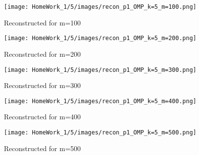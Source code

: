 \documentclass{article}
\begin{document}
\begin{figure}[h!]
    \centering
    \begin{minipage}{0.1\textwidth}
        \texttt{[image: HomeWork\_1/5/images/recon\_p1\_OMP\_k=5\_m=100.png]}
        \caption{Reconstructed for m=100}
    \end{minipage}
    \hspace{0.5cm}
    \begin{minipage}{0.1\textwidth}
        \centering
        \texttt{[image: HomeWork\_1/5/images/recon\_p1\_OMP\_k=5\_m=200.png]}
        \caption{Reconstructed for m=200}
    \end{minipage}
    \hspace{0.5cm}
    \begin{minipage}{0.1\textwidth}
        \centering
        \texttt{[image: HomeWork\_1/5/images/recon\_p1\_OMP\_k=5\_m=300.png]}
        \caption{Reconstructed for m=300}
    \end{minipage}
    \hspace{0.5cm}
    \begin{minipage}{0.1\textwidth}
        \centering
        \texttt{[image: HomeWork\_1/5/images/recon\_p1\_OMP\_k=5\_m=400.png]}
        \caption{Reconstructed for m=400}
    \end{minipage}
    \hspace{0.5cm}
    \begin{minipage}{0.1\textwidth}
        \centering
        \texttt{[image: HomeWork\_1/5/images/recon\_p1\_OMP\_k=5\_m=500.png]}
        \caption{Reconstructed for m=500}
    \end{minipage}

    \vspace{1cm} %


\end{figure}
\end{document}
